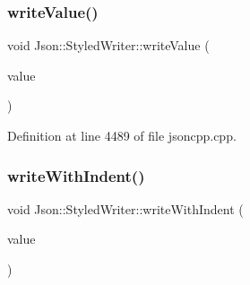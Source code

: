 \hypertarget{class_json_1_1_styled_writer_ac40143cf43f7c4a94d3d0b41e5245069}{}\label{class_json_1_1_styled_writer_ac40143cf43f7c4a94d3d0b41e5245069} 
\subsubsection{\texorpdfstring{write\+Value()}{writeValue()}\hspace{0.1cm}{\footnotesize\ttfamily [2/2]}}
{\footnotesize\ttfamily void Json\+::\+Styled\+Writer\+::write\+Value (\begin{DoxyParamCaption}\item[{const \hyperlink{class_json_1_1_value}{Value} \&}]{value }\end{DoxyParamCaption})\hspace{0.3cm}{\ttfamily [private]}}



Definition at line 4489 of file jsoncpp.\+cpp.

\hypertarget{class_json_1_1_styled_writer_ac38e02972054125c38efbe327b52f6ac}{}\label{class_json_1_1_styled_writer_ac38e02972054125c38efbe327b52f6ac} 
\subsubsection{\texorpdfstring{write\+With\+Indent()}{writeWithIndent()}\hspace{0.1cm}{\footnotesize\ttfamily [1/2]}}
{\footnotesize\ttfamily void Json\+::\+Styled\+Writer\+::write\+With\+Indent (\begin{DoxyParamCaption}\item[{const \hyperlink{config_8h_a1e723f95759de062585bc4a8fd3fa4be}{J\+S\+O\+N\+C\+P\+P\+\_\+\+S\+T\+R\+I\+NG} \&}]{value }\end{DoxyParamCaption})\hspace{0.3cm}{\ttfamily [private]}}

\hypertarget{class_json_1_1_styled_writer_ac38e02972054125c38efbe327b52f6ac}{}\label{class_json_1_1_styled_writer_ac38e02972054125c38efbe327b52f6ac} 
